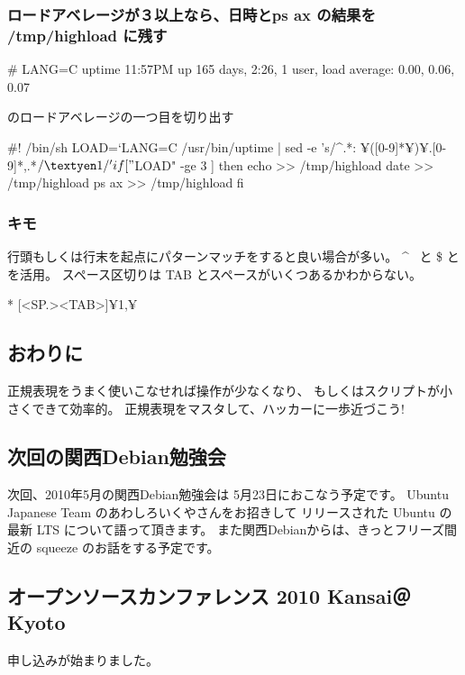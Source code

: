 \documentclass[mingoth,a4paper]{jsarticle}
\begin{document}
\subsubsection{%
ロードアベレージが３以上なら、日時とps ax の結果を /tmp/highload に残す}
\begin{commandline}
      # LANG=C uptime
      11:57PM  up 165 days,  2:26,  1 user,  load average: 0.00, 0.06, 0.07
\end{commandline}
      のロードアベレージの一つ目を切り出す

      \begin{commandline}
      #! /bin/sh 
      LOAD=`LANG=C /usr/bin/uptime | sed -e 's/^.*: ¥([0-9]*¥)¥.[0-9]*,.*$/¥1/'
      if [ "$LOAD" -ge 3 ]
      then
            echo >> /tmp/highload
            date >> /tmp/highload
            ps ax >> /tmp/highload
      fi
      \end{commandline}


\subsubsection{キモ }

行頭もしくは行末を起点にパターンマッチをすると良い場合が多い。
\^~ と \$ とを活用。
スペース区切りは TAB とスペースがいくつあるかわからない。
\begin{commandline}
[<SP.><TAB>][<SP><TAB>]*
[<SP.><TAB>]¥{1,¥}
\end{commandline}

\subsection{おわりに}

正規表現をうまく使いこなせれば操作が少なくなり、
もしくはスクリプトが小さくできて効率的。 正規表現をマスタして、ハッカーに一歩近づこう!


\subsection{次回の関西Debian勉強会}
次回、2010年5月の関西Debian勉強会は 5月23日におこなう予定です。
Ubuntu Japanese Team のあわしろいくやさんをお招きして
リリースされた Ubuntu の最新 LTS について語って頂きます。
また関西Debianからは、きっとフリーズ間近の squeeze のお話をする予定です。

\subsection{オープンソースカンファレンス 2010 Kansai＠Kyoto}
申し込みが始まりました。
\end{document}
